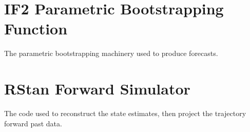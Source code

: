 
\section{IF2 Parametric Bootstrapping Function}

    The parametric bootstrapping machinery used to produce forecasts.

    

\section{RStan Forward Simulator}

    The code used to reconstruct the state estimates, then project the trajectory forward past data.

    